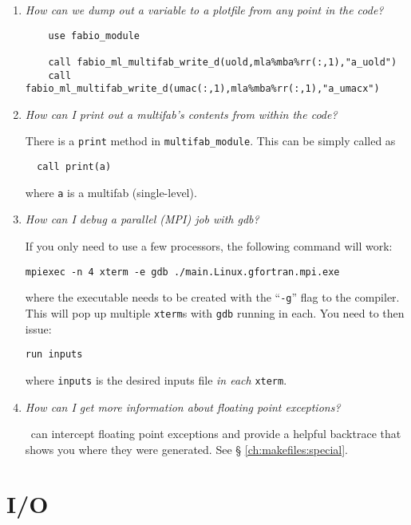 \begin{enumerate}

\item {\em How can we dump out a variable to a plotfile from any point in the
   code?} 
%
\begin{verbatim}
    use fabio_module

    call fabio_ml_multifab_write_d(uold,mla%mba%rr(:,1),"a_uold")
    call fabio_ml_multifab_write_d(umac(:,1),mla%mba%rr(:,1),"a_umacx")
\end{verbatim}

\item {\em How can I print out a multifab's contents from within the code?}

  There is a {\tt print} method in {\tt multifab\_module}.  This can
  be simply called as
  \begin{verbatim}
  call print(a)
  \end{verbatim}
  where {\tt a} is a multifab (single-level).

\item {\em How can I debug a parallel (MPI) job with gdb?}

If you only need to use a few processors, the following command will work:
\begin{verbatim}
mpiexec -n 4 xterm -e gdb ./main.Linux.gfortran.mpi.exe 
\end{verbatim}
where the executable needs to be created with the ``{\tt -g}'' flag to
the compiler.  This will pop up multiple {\tt xterm}s with {\tt gdb} running
in each.  You need to then issue:
\begin{verbatim}
run inputs
\end{verbatim}
where {\tt inputs} is the desired inputs file {\em in each} {\tt xterm}.



\item {\em How can I get more information about floating point exceptions?}

\amrex\ can intercept floating point exceptions and provide a helpful
backtrace that shows you where they were generated.  See \S
\ref{ch:makefiles:special}.


\end{enumerate}


\section{I/O}

